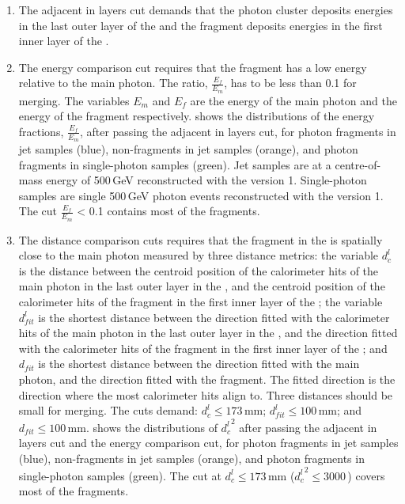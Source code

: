 \begin{enumerate}
  \item The adjacent in layers cut demands that the photon cluster deposits energies in the last outer layer of the \ECAL   and  the fragment deposits energies in the first inner layer of the \HCAL.
  \item
The energy comparison cut requires that the fragment has a low energy relative to the main photon. The ratio, $\frac{E_f}{E_m}$, has to be less than 0.1 for merging. The variables $E_m$ and $E_f$ are the energy of the main photon  and the energy of the fragment respectively.  shows the distributions of  the energy fractions, $\frac{E_f}{E_m}$, after passing the adjacent in layers cut, for photon fragments in jet samples (blue), non-fragments in jet samples (orange), and photon fragments in single-photon samples (green). Jet samples are \eeZuds at a centre-of-mass energy of 500\,GeV reconstructed with the \pandora version 1. Single-photon samples are single 500\,GeV photon events  reconstructed with the \pandora version 1. The cut $\frac{E_f}{E_m}$ < 0.1 contains most of the fragments.
  \item
The distance comparison cuts requires that the fragment in the \HCAL is spatially close to the main photon measured by three distance metrics: the variable $d^l_c$ is the distance between the centroid position of the calorimeter hits of the main photon in the last outer layer in the \ECAL, and the centroid position of the calorimeter hits of the fragment in the first inner layer of the \HCAL; the variable $d^l_{fit}$ is the shortest distance between the direction fitted with the calorimeter hits of the main photon in the  last outer layer in the \ECAL, and the direction fitted with  the calorimeter hits of the fragment in the first inner layer of the \HCAL; and $d_{fit}$ is the shortest distance between the direction fitted with the main photon, and the direction fitted with the fragment. The fitted direction is the direction where the most calorimeter hits align to. Three distances should be small for merging. The cuts demand: $d^l_c \leqslant 173\,\text{mm}$; $d^l_{fit} \leqslant 100\,\text{mm}$; and $d_{fit} \leqslant 100\,\text{mm}$.   shows the distributions of ${d^l_c}^2$  after passing the adjacent in layers cut and the energy comparison cut, for photon fragments in jet samples (blue), non-fragments in jet samples (orange), and photon fragments in single-photon samples (green). The cut at  $d^l_c \leqslant 173$\,mm (${d^l_c}^2 \leqslant 3000$\,) covers most of the fragments.


\end{enumerate}

